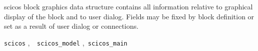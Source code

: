 scicos block graphics data structure contains all information relative
to graphical display of the block and to user dialog. Fields may be
fixed by block definition or set as a result of user dialog or connections. 

{\verb?scicos?} \pageref{scicos},{\verb?  scicos_model?} \pageref{scicosmodel},{\verb? scicos_main ?} \pageref{scicosmain}











%
%


\label{scicosmodel}

